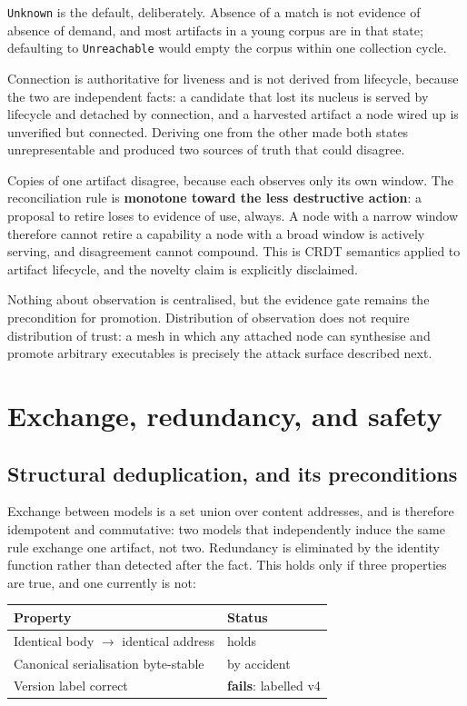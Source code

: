 \documentclass[11pt,twocolumn]{article}
\begin{document}
\texttt{Unknown} is the default, deliberately. Absence of a match is not
evidence of absence of demand, and most artifacts in a young corpus are in that
state; defaulting to \texttt{Unreachable} would empty the corpus within one
collection cycle.

Connection is authoritative for liveness and is not derived from lifecycle,
because the two are independent facts: a candidate that lost its nucleus is
served by lifecycle and detached by connection, and a harvested artifact a node
wired up is unverified but connected. Deriving one from the other made both
states unrepresentable and produced two sources of truth that could disagree.

Copies of one artifact disagree, because each observes only its own window. The
reconciliation rule is \textbf{monotone toward the less destructive action}: a
proposal to retire loses to evidence of use, always. A node with a narrow
window therefore cannot retire a capability a node with a broad window is
actively serving, and disagreement cannot compound. This is CRDT semantics
applied to artifact lifecycle, and the novelty claim is explicitly disclaimed.

Nothing about observation is centralised, but the evidence gate remains the
precondition for promotion. Distribution of observation does not require
distribution of trust: a mesh in which any attached node can synthesise and
promote arbitrary executables is precisely the attack surface described next.

\section{Exchange, redundancy, and safety}

\subsection{Structural deduplication, and its preconditions}

Exchange between models is a set union over content addresses, and is therefore
idempotent and commutative: two models that independently induce the same rule
exchange one artifact, not two. Redundancy is eliminated by the identity
function rather than detected after the fact. This holds only if three
properties are true, and one currently is not:

\begin{center}
\small
\begin{tabular}{@{}ll@{}}
\toprule
\textbf{Property} & \textbf{Status} \\
\midrule
Identical body $\to$ identical address & holds \\
Canonical serialisation byte-stable & by accident \\
Version label correct & \textbf{fails}: labelled v4 \\
\bottomrule
\end{tabular}
\normalsize
\end{center}
\end{document}
